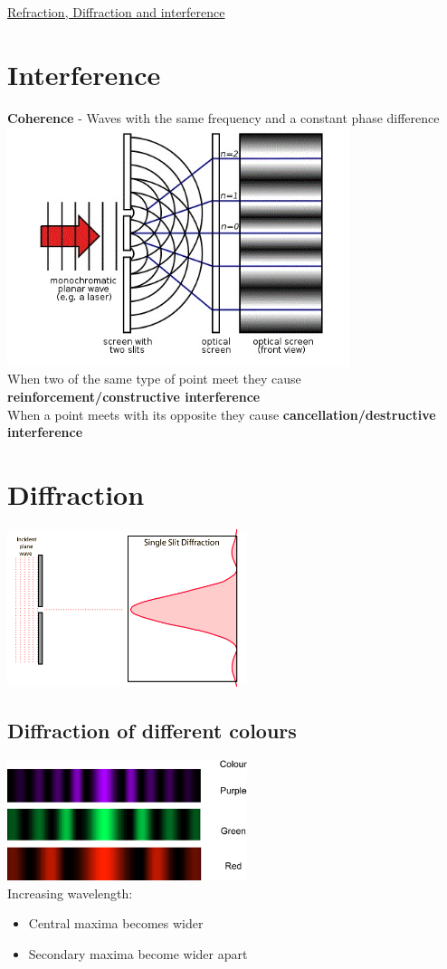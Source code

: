 \documentclass{article}[18pt]
\begin{document}
\begin{center}
\underline{\huge Refraction, Diffraction and interference}
\end{center}
\section{Interference}
\textbf{Coherence} - Waves with the same frequency and a constant phase difference\\
\includegraphics[width=10cm]{Interference.jpg}\\
When two of the same type of point meet they cause \textbf{reinforcement/constructive interference}\\
When a point meets with its opposite they cause \textbf{cancellation/destructive interference}
\section{Diffraction}
\includegraphics[width=7cm]{Diffraction.png}
\subsection{Diffraction of different colours}
\includegraphics[width=7cm]{Diffraction_Colours.png}\\
Increasing wavelength:
\begin{itemize}
\item Central maxima becomes wider
\item Secondary maxima become wider apart
\end{itemize}
\newpage
\end{document}
